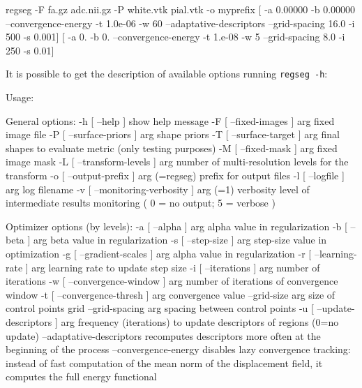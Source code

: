 \documentclass[a4paper]{report}
\begin{document}
\begin{bashcode}
regseg -F fa.gz adc.nii.gz -P white.vtk pial.vtk -o myprefix [ -a 0.00000 -b 0.00000 --convergence-energy -t 1.0e-06 -w 60 --adaptative-descriptors --grid-spacing 16.0 -i 500 -s 0.001] [ -a 0. -b 0. --convergence-energy -t 1.e-08 -w 5 --grid-spacing 8.0 -i 250 -s 0.01]
\end{bashcode}


It is possible to get the description of available options running
  \lstinline!regseg -h!:

\begin{bashcode}
Usage:

General options:
  -h [ --help ]                         show help message
  -F [ --fixed-images ] arg             fixed image file
  -P [ --surface-priors ] arg           shape priors
  -T [ --surface-target ] arg           final shapes to evaluate metric (only
                                        testing purposes)
  -M [ --fixed-mask ] arg               fixed image mask
  -L [ --transform-levels ] arg         number of multi-resolution levels for
                                        the transform
  -o [ --output-prefix ] arg (=regseg)  prefix for output files
  -l [ --logfile ] arg                  log filename
  -v [ --monitoring-verbosity ] arg (=1)
                                        verbosity level of intermediate results
                                        monitoring ( 0 = no output; 5 = verbose
                                        )

Optimizer options (by levels):
  -a [ --alpha ] arg              alpha value in regularization
  -b [ --beta ] arg               beta value in regularization
  -s [ --step-size ] arg          step-size value in optimization
  -g [ --gradient-scales ] arg    alpha value in regularization
  -r [ --learning-rate ] arg      learning rate to update step size
  -i [ --iterations ] arg         number of iterations
  -w [ --convergence-window ] arg number of iterations of convergence window
  -t [ --convergence-thresh ] arg convergence value
  --grid-size arg                 size of control points grid
  --grid-spacing arg              spacing between control points
  -u [ --update-descriptors ] arg frequency (iterations) to update descriptors
                                  of regions (0=no update)
  --adaptative-descriptors        recomputes descriptors more often at the
                                  beginning of the process
  --convergence-energy            disables lazy convergence tracking: instead
                                  of fast computation of the mean norm of the
                                  displacement field, it computes the full
                                  energy functional


\end{bashcode}
\end{document}

